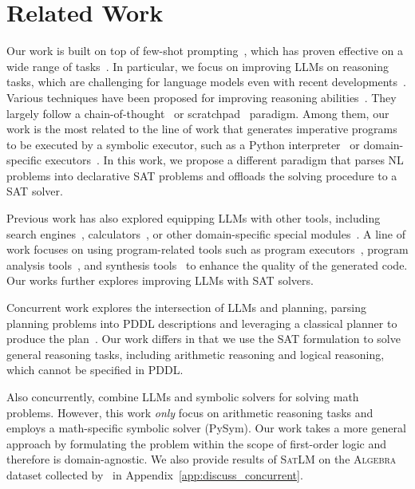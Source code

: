 \documentclass{article}
\theoremstyle{definition}
\newcommand{\algebra}{\textsc{Algebra}}
\newcommand{\satlm}{\textsc{SatLM}}
\begin{document}
\section{Related Work}
Our work is built on top of few-shot prompting~\citep{gpt3}, which has proven effective on a wide range of tasks~\citep{wei2022emergent, promptsurvey, gem, recipe, flan, sanh2022multitask}. In particular, we focus on improving LLMs on reasoning tasks, which are challenging for language models even with recent developments~\citep{marcus2020next,garcez2023neurosymbolic}. Various techniques have been proposed for improving reasoning abilities~\citep{scratch,LeasttoMostPE, zerocot,khot2022decomposed, fu2022complexity,pinto,li2022explanations,faithfulcot}. They largely follow a chain-of-thought~\citep{chain} or scratchpad~\citep{scratch} paradigm. Among them, our work is the most related to the line of work that generates imperative programs to be executed by a symbolic executor, such as a Python interpreter~\citep{pal,progcot} or domain-specific executors~\citep{faithfulcot}. In this work, we propose a different paradigm that parses NL problems into declarative SAT problems and offloads the solving procedure to a SAT solver.

Previous work has also explored equipping LLMs with other tools, including search engines~\citep{yu2023generate,toolformer}, calculators~\citep{gsm8k,palm}, or other domain-specific special modules~\citep{toolformer,neuralsymlm}. A line of work focuses on using program-related tools such as program executors~\citep{poesia2022synchromesh}, program analysis tools~\citep{jigsaw}, and synthesis tools~\citep{marriage} to enhance the quality of the generated code. Our works further explores improving LLMs with SAT solvers.

Concurrent work explores the intersection of LLMs and planning, parsing planning problems into PDDL descriptions and leveraging a classical planner to produce the plan~\citep{liu2023llmplanner}. Our work differs in that we use the SAT formulation to solve general reasoning tasks, including arithmetic reasoning and logical reasoning, which cannot be specified in PDDL.

Also concurrently, \citet{gsmsat} combine LLMs and symbolic solvers for solving math problems. However, this work \emph{only} focus on arithmetic reasoning tasks and employs a math-specific symbolic solver (PySym). Our work takes a more general approach by formulating the problem within the scope of first-order logic and therefore is domain-agnostic. We also provide results of \satlm{} on the \algebra{} dataset collected by~\citet{gsmsat} in Appendix~\ref{app:discuss_concurrent}.
\end{document}
